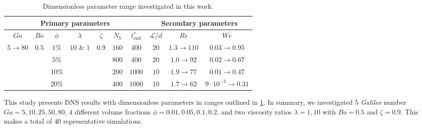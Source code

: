 \begin{table}[h!]
    \centering
    \caption{Dimensionless parameter range investigated in this work.}
    \begin{tabular}{|ccccccc|ccc|}
        \hline
        \multicolumn{7}{|c}{Primary parameters} & \multicolumn{3}{||c|}{Secondary parameters}\\ \hline
        \multicolumn{1}{|c|}{$Ga$}                               & \multicolumn{1}{c|}{$Bo$}                   & \multicolumn{1}{c|}{$\phi$} & \multicolumn{1}{c|}{$\lambda$}                    & \multicolumn{1}{c|}{$\zeta$}                & \multicolumn{1}{c|}{$N_b$} & $t^*_\text{end}$ & \multicolumn{1}{||c|}{$\mathcal{L}/d$} & \multicolumn{1}{c|}{$Re$}  & $We$   \\ \hline
        \multicolumn{1}{|c|}{\multirow{4}{*}{$5\rightarrow 80$}} & \multicolumn{1}{c|}{\multirow{4}{*}{$0.5$}} & \multicolumn{1}{c|}{$1\%$}  & \multicolumn{1}{c|}{\multirow{4}{*}{$10$ \& $1$}} & \multicolumn{1}{c|}{\multirow{4}{*}{$0.9$}} & \multicolumn{1}{c|}{$160$} & $400$           & \multicolumn{1}{||c|}{$20$}            & \multicolumn{1}{c|}{$1.3\to 110$} & {$0.03\to 0.95$} \\ 
        \multicolumn{1}{|c|}{}                                   & \multicolumn{1}{c|}{}                       & \multicolumn{1}{c|}{$5\%$}  & \multicolumn{1}{c|}{}                             & \multicolumn{1}{c|}{}                       & \multicolumn{1}{c|}{$800$} & $400$           & \multicolumn{1}{||c|}{$20$}            & \multicolumn{1}{c|}{$1.0\to 92$} &  {$0.02\to 0.67$}\\ 
        \multicolumn{1}{|c|}{}                                   & \multicolumn{1}{c|}{}                       & \multicolumn{1}{c|}{$10\%$} & \multicolumn{1}{c|}{}                             & \multicolumn{1}{c|}{}                       & \multicolumn{1}{c|}{$200$} & $1000$           & \multicolumn{1}{||c|}{$10$}            & \multicolumn{1}{c|}{$1.9\to 77$}&  {$0.01\to 0.47$}\\ 
        \multicolumn{1}{|c|}{}                                   & \multicolumn{1}{c|}{}                       & \multicolumn{1}{c|}{$20\%$} & \multicolumn{1}{c|}{}                             & \multicolumn{1}{c|}{}                       & \multicolumn{1}{c|}{$400$} & $1000$           & \multicolumn{1}{||c|}{$10$}            & \multicolumn{1}{c|}{$1.7\to 62$}&  {$9\cdot 10^{-3}\to 0.31$}\\ \hline
        \end{tabular}
    \label{tab:simulations}
\end{table}
This study presents DNS results with dimensionless parameters in ranges outlined in \ref{tab:simulations}.
In summary, we investigated $5$ \textit{Galileo} number $Ga = 5,10,25,50,80$, $4$ different volume fractions $\phi = 0.01,0.05,0.1,0.2$, and two viscosity ratios $\lambda =1,10$ with $Bo = 0.5$ and $\zeta = 0.9$. %
This makes a total of $40$ representative simulations.